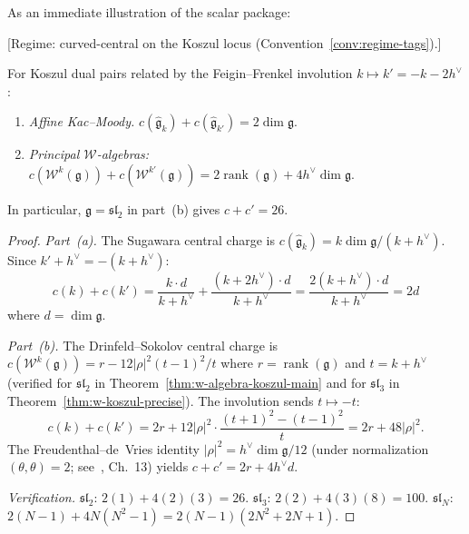 As an immediate illustration of the scalar package:

\begin{theorem}\label{thm:central-charge-complementarity}
\textup{[Regime: curved-central on the Koszul locus
\textup{(}Convention~\textup{\ref{conv:regime-tags})}.]}

For Koszul dual pairs related by the Feigin--Frenkel involution
$k \mapsto k' = -k - 2h^\vee$:
\begin{enumerate}
\item[\textup{(a)}] \emph{Affine Kac--Moody.}
  $c(\widehat{\mathfrak{g}}_k) + c(\widehat{\mathfrak{g}}_{k'})
  = 2 \dim \mathfrak{g}$.
\item[\textup{(b)}] \emph{Principal $\mathcal{W}$-algebras:}
  $c(\mathcal{W}^k(\mathfrak{g})) + c(\mathcal{W}^{k'}(\mathfrak{g}))
   = 2\operatorname{rank}(\mathfrak{g}) + 4h^\vee \dim \mathfrak{g}$.
\end{enumerate}
In particular, $\mathfrak{g} = \mathfrak{sl}_2$ in
part~\textup{(b)} gives $c + c' = 26$.
\end{theorem}

\begin{proof}
\emph{Part~(a).}  The Sugawara central charge is
$c(\widehat{\mathfrak{g}}_k) = k \dim\mathfrak{g}/(k + h^\vee)$.
Since $k' + h^\vee = -(k + h^\vee)$:
\[
c(k) + c(k') = \frac{k \cdot d}{k+h^\vee}
+ \frac{(k+2h^\vee) \cdot d}{k+h^\vee}
= \frac{2(k + h^\vee) \cdot d}{k+h^\vee} = 2d
\]
where $d = \dim\mathfrak{g}$.

\emph{Part~(b).}  The Drinfeld--Sokolov central charge is
$c(\mathcal{W}^k(\mathfrak{g})) = r - 12|\rho|^2 (t-1)^2/t$
where $r = \operatorname{rank}(\mathfrak{g})$ and
$t = k + h^\vee$
(verified for $\mathfrak{sl}_2$ in
Theorem~\ref{thm:w-algebra-koszul-main} and for $\mathfrak{sl}_3$
in Theorem~\ref{thm:w-koszul-precise}).
The involution sends $t \mapsto -t$:
\[
c(k) + c(k') = 2r + 12|\rho|^2 \cdot
\frac{(t+1)^2 - (t-1)^2}{t}
= 2r + 48|\rho|^2.
\]
The Freudenthal--de~Vries identity
$|\rho|^2 = h^\vee \dim\mathfrak{g}/12$
(under normalization $(\theta, \theta) = 2$;
see~\cite{Kac}, Ch.~13)
yields $c + c' = 2r + 4h^\vee d$.

\emph{Verification.}
$\mathfrak{sl}_2$: $2(1) + 4(2)(3) = 26$.
$\mathfrak{sl}_3$: $2(2) + 4(3)(8) = 100$.
$\mathfrak{sl}_N$:
$2(N{-}1) + 4N(N^2{-}1) = 2(N{-}1)(2N^2{+}2N{+}1)$.
\end{proof}

